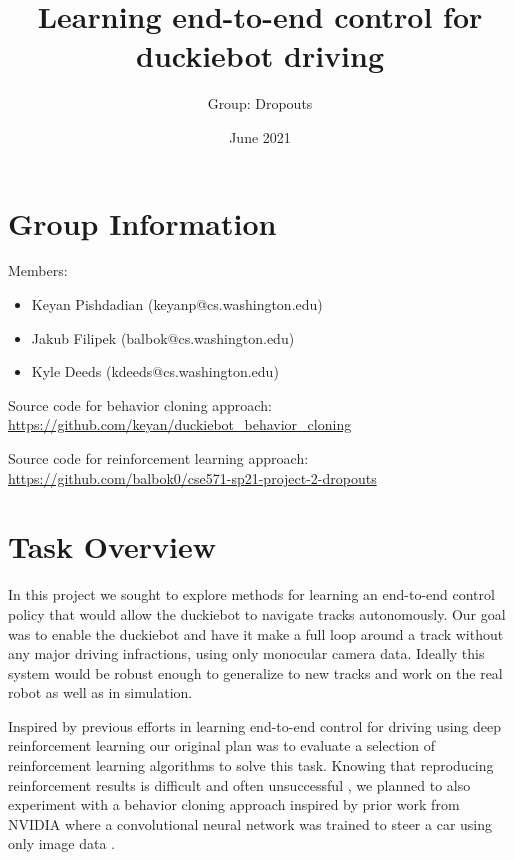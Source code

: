 \documentclass{article}
\title{Learning end-to-end control for duckiebot driving}
\author{Group: Dropouts}
\date{June 2021}
\begin{document}
\maketitle

\section{Group Information}

Members:
\begin{itemize}
    \item Keyan Pishdadian (keyanp@cs.washington.edu)
    \item Jakub Filipek (balbok@cs.washington.edu)
    \item Kyle Deeds (kdeeds@cs.washington.edu)
\end{itemize}

\noindent Source code for behavior cloning approach:
\newline
\url{https://github.com/keyan/duckiebot_behavior_cloning}

\noindent Source code for reinforcement learning approach:
\newline
\url{https://github.com/balbok0/cse571-sp21-project-2-dropouts}

\section{Task Overview}

In this project we sought to explore methods for learning an end-to-end control policy that would allow the duckiebot to navigate tracks autonomously. Our goal was to enable the duckiebot and have it make a full loop around a track without any major driving infractions, using only monocular camera data. Ideally this system would be robust enough to generalize to new tracks and work on the real robot as well as in simulation.

Inspired by previous efforts in learning end-to-end control for driving using deep reinforcement learning \cite{DBLP:journals/corr/abs-1807-00412} our original plan was to evaluate a selection of reinforcement learning algorithms to solve this task. Knowing that reproducing reinforcement results is difficult and often unsuccessful \cite{henderson2019deep}, we planned to also experiment with a behavior cloning approach inspired by prior work from NVIDIA where a convolutional neural network was trained to steer a car using only image data \cite{DBLP:journals/corr/BojarskiTDFFGJM16}.
\end{document}
